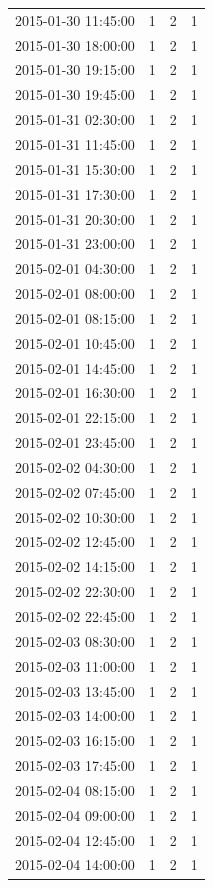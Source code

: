 \begin{tabular}{lrrr}
2015-01-30 11:45:00 & 1 & 2 & 1 \\
2015-01-30 18:00:00 & 1 & 2 & 1 \\
2015-01-30 19:15:00 & 1 & 2 & 1 \\
2015-01-30 19:45:00 & 1 & 2 & 1 \\
2015-01-31 02:30:00 & 1 & 2 & 1 \\
2015-01-31 11:45:00 & 1 & 2 & 1 \\
2015-01-31 15:30:00 & 1 & 2 & 1 \\
2015-01-31 17:30:00 & 1 & 2 & 1 \\
2015-01-31 20:30:00 & 1 & 2 & 1 \\
2015-01-31 23:00:00 & 1 & 2 & 1 \\
2015-02-01 04:30:00 & 1 & 2 & 1 \\
2015-02-01 08:00:00 & 1 & 2 & 1 \\
2015-02-01 08:15:00 & 1 & 2 & 1 \\
2015-02-01 10:45:00 & 1 & 2 & 1 \\
2015-02-01 14:45:00 & 1 & 2 & 1 \\
2015-02-01 16:30:00 & 1 & 2 & 1 \\
2015-02-01 22:15:00 & 1 & 2 & 1 \\
2015-02-01 23:45:00 & 1 & 2 & 1 \\
2015-02-02 04:30:00 & 1 & 2 & 1 \\
2015-02-02 07:45:00 & 1 & 2 & 1 \\
2015-02-02 10:30:00 & 1 & 2 & 1 \\
2015-02-02 12:45:00 & 1 & 2 & 1 \\
2015-02-02 14:15:00 & 1 & 2 & 1 \\
2015-02-02 22:30:00 & 1 & 2 & 1 \\
2015-02-02 22:45:00 & 1 & 2 & 1 \\
2015-02-03 08:30:00 & 1 & 2 & 1 \\
2015-02-03 11:00:00 & 1 & 2 & 1 \\
2015-02-03 13:45:00 & 1 & 2 & 1 \\
2015-02-03 14:00:00 & 1 & 2 & 1 \\
2015-02-03 16:15:00 & 1 & 2 & 1 \\
2015-02-03 17:45:00 & 1 & 2 & 1 \\
2015-02-04 08:15:00 & 1 & 2 & 1 \\
2015-02-04 09:00:00 & 1 & 2 & 1 \\
2015-02-04 12:45:00 & 1 & 2 & 1 \\
2015-02-04 14:00:00 & 1 & 2 & 1 \\

\end{tabular}
